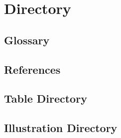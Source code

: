 \chapter{Directory}
\section{Glossary}

\section{References}

\section{Table Directory}

\section{Illustration Directory}